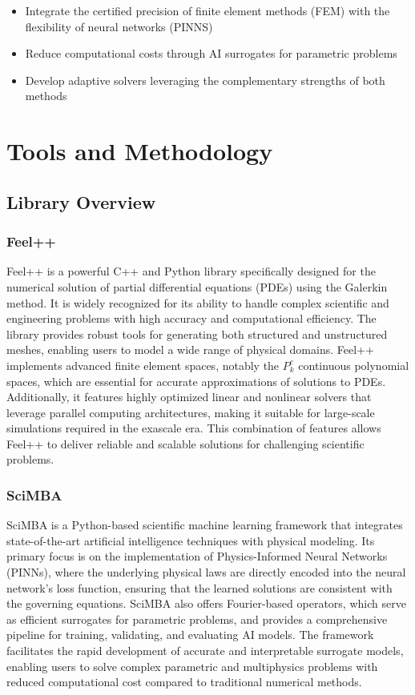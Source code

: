 \documentclass[12pt]{article}
\begin{document}
\begin{itemize}
    \item Integrate the certified precision of finite element methods (FEM) with the flexibility of neural networks (PINNS)
    \item Reduce computational costs through AI surrogates for parametric problems
    \item Develop adaptive solvers leveraging the complementary strengths of both methods
\end{itemize}

\section{Tools and Methodology}

\subsection{Library Overview}

\subsubsection{Feel++}

Feel++ is a powerful C++ and Python library specifically designed for the numerical solution of partial differential equations (PDEs) using the Galerkin method. It is widely recognized for its ability to handle complex scientific and engineering problems with high accuracy and computational efficiency. The library provides robust tools for generating both structured and unstructured meshes, enabling users to model a wide range of physical domains. Feel++ implements advanced finite element spaces, notably the \(P_{k}^{c}\) continuous polynomial spaces, which are essential for accurate approximations of solutions to PDEs. Additionally, it features highly optimized linear and nonlinear solvers that leverage parallel computing architectures, making it suitable for large-scale simulations required in the exascale era. This combination of features allows Feel++ to deliver reliable and scalable solutions for challenging scientific problems.

\subsubsection{SciMBA}

SciMBA is a Python-based scientific machine learning framework that integrates state-of-the-art artificial intelligence techniques with physical modeling. Its primary focus is on the implementation of Physics-Informed Neural Networks (PINNs), where the underlying physical laws are directly encoded into the neural network’s loss function, ensuring that the learned solutions are consistent with the governing equations. SciMBA also offers Fourier-based operators, which serve as efficient surrogates for parametric problems, and provides a comprehensive pipeline for training, validating, and evaluating AI models. The framework facilitates the rapid development of accurate and interpretable surrogate models, enabling users to solve complex parametric and multiphysics problems with reduced computational cost compared to traditional numerical methods.
\end{document}
